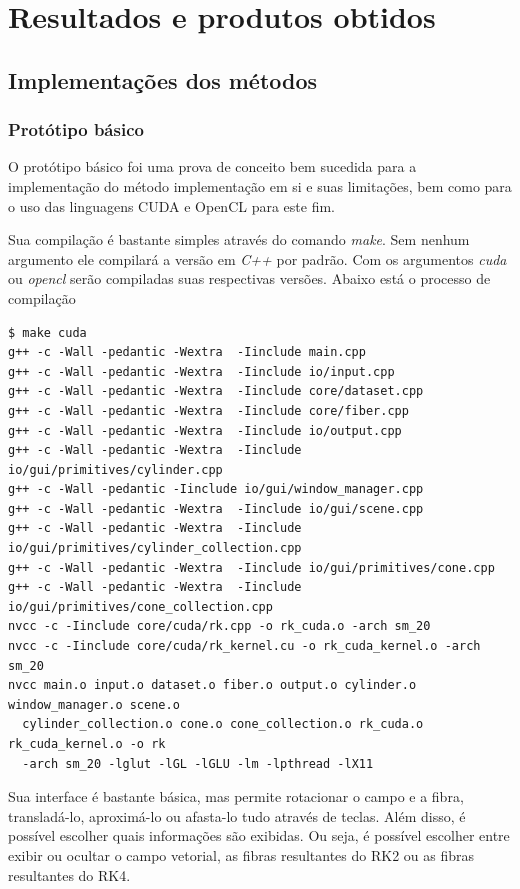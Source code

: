 \chapter{Resultados e produtos obtidos}

\section{Implementações dos métodos}
  \subsection{Protótipo básico}
  O protótipo básico foi uma prova de conceito bem sucedida para a implementação do método implementação em si e suas limitações, bem como para o uso das linguagens CUDA e OpenCL para este fim.
  
  Sua compilação é bastante simples através do comando \textit{make}. Sem nenhum argumento ele compilará a versão em \textit{C++} por padrão. Com os argumentos \textit{cuda} ou \textit{opencl} serão compiladas suas respectivas versões. Abaixo está o processo de compilação
  
  {\scriptsize
  \begin{verbatim}
$ make cuda
g++ -c -Wall -pedantic -Wextra  -Iinclude main.cpp
g++ -c -Wall -pedantic -Wextra  -Iinclude io/input.cpp
g++ -c -Wall -pedantic -Wextra  -Iinclude core/dataset.cpp
g++ -c -Wall -pedantic -Wextra  -Iinclude core/fiber.cpp
g++ -c -Wall -pedantic -Wextra  -Iinclude io/output.cpp
g++ -c -Wall -pedantic -Wextra  -Iinclude io/gui/primitives/cylinder.cpp
g++ -c -Wall -pedantic -Iinclude io/gui/window_manager.cpp
g++ -c -Wall -pedantic -Wextra  -Iinclude io/gui/scene.cpp
g++ -c -Wall -pedantic -Wextra  -Iinclude io/gui/primitives/cylinder_collection.cpp
g++ -c -Wall -pedantic -Wextra  -Iinclude io/gui/primitives/cone.cpp
g++ -c -Wall -pedantic -Wextra  -Iinclude io/gui/primitives/cone_collection.cpp
nvcc -c -Iinclude core/cuda/rk.cpp -o rk_cuda.o -arch sm_20
nvcc -c -Iinclude core/cuda/rk_kernel.cu -o rk_cuda_kernel.o -arch sm_20
nvcc main.o input.o dataset.o fiber.o output.o cylinder.o window_manager.o scene.o
  cylinder_collection.o cone.o cone_collection.o rk_cuda.o rk_cuda_kernel.o -o rk
  -arch sm_20 -lglut -lGL -lGLU -lm -lpthread -lX11
  \end{verbatim}
  }
  
  \newpage
  Sua interface é bastante básica, mas permite rotacionar o campo e a fibra, transladá-lo, aproximá-lo ou afasta-lo tudo através de teclas. Além disso, é possível escolher quais informações são exibidas. Ou seja, é possível escolher entre exibir ou ocultar o campo vetorial, as fibras resultantes do RK2 ou as fibras resultantes do RK4.
  
